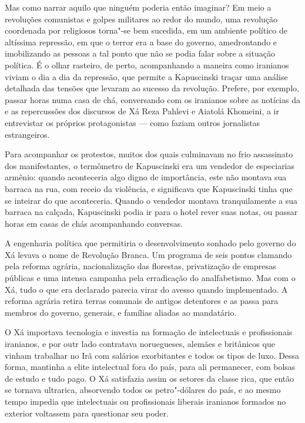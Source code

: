 Mas como narrar aquilo que ninguém poderia então imaginar? Em meio a
revoluções comunistas e golpes militares ao redor do mundo, uma
revolução coordenada por religiosos torna"-se bem sucedida, em um
ambiente político de altíssima repressão, em que o terror era a base do
governo, amedrontando e imobilizando as pessoas a tal ponto que
não se podia falar sobre a situação política. É o olhar rasteiro, de
perto, acompanhando a maneira como iranianos viviam o dia a dia da
repressão, que permite a Kapuscinski traçar uma análise detalhada das
tensões que levaram ao sucesso da revolução. Prefere, por exemplo,
passar horas numa casa de chá, conversando com os iranianos sobre as
notícias da  e as repercussões dos discursos de Xá Reza Pahlevi e
Aiatolá Khomeini, a ir entrevistar os próprios protagonistas --- como
faziam outros jornalistas estrangeiros.

Para acompanhar os protestos, muitos dos quais culminavam no frio
assassinato dos manifestantes, o termômetro de Kapuscinski era um
vendedor de especiarias armênio: quando aconteceria algo digno de
importância, este não montava sua barraca na rua, com receio da
violência, e significava que Kapuscinski tinha que se inteirar do que
aconteceria. Quando o vendedor montava tranquilamente a sua barraca na
calçada, Kapuscinski podia ir para o hotel rever suas notas, ou passar
horas em casas de chás acompanhando conversas.

A engenharia política que permitiria o desenvolvimento sonhado pelo
governo do Xá levava o nome de Revolução Branca. Um programa de seis
pontos clamando pela reforma agrária, nacionalização das florestas,
privatização de empresas públicas e uma intensa campanha pela
erradicação do analfabetismo. Mas com o Xá, tudo o que era declarado
parecia virar do avesso quando implementado. A reforma agrária retira
terras comunais de antigos detentores e as passa para membros do
governo, generais, e famílias aliadas ao mandatário.

O Xá importava
tecnologia e investia na formação de intelectuais e profissionais
iranianos, e por outr lado contratava noruegueses, alemães e britânicos que
vinham trabalhar no Irã com salários exorbitantes e todos os tipos de
luxo. Dessa forma, mantinha a elite intelectual fora do país, para ali
permanecer, com bolsas de estudo e tudo pago. O Xá satisfazia assim os setores da
classe rica, que então se tornava ultrarica, absorvendo todos os
petro"-dólares do país, e ao mesmo tempo impedia que intelectuais ou
profissionais liberais iranianos formados no exterior voltassem para
questionar seu poder.

